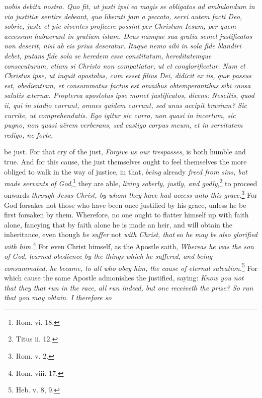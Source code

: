 \emph{nobis debita nostra. Quo fit, ut justi ipsi eo magis se obligatos ad ambulandum in via justitiæ sentire debeant, quo liberati jam a peccato, servi autem facti Deo, sobrie, juste et pie viventes proficere possint per Christum Iesum, per quem accessum habuerunt in gratiam istam. Deus namque sua gratia semel justificatos non deserit, nisi ab eis prius deseratur. Itaque nemo sibi in sola fide blandiri debet, putans fide sola se heredem esse constitutum, hereditatemque consecuturum, etiam si Christo non compatiatur, ut et conglorificetur. Nam et Christus ipse, ut inquit apostolus, cum esset filius Dei, didicit ex iis, quæ passus est, obedientiam, et consummatus factus est omnibus obtemperantibus sibi causa salutis æternæ. Propterea apostolus ipse monet justificatos, dicens: Nescitis, quod ii, qui in stadio currunt, omnes quidem currunt, sed unus accipit bravium? Sic currite, ut comprehendatis. Ego igitur sic curro, non quasi in incertum, sic pugno, non quasi aërem verberans, sed castigo corpus meum, et in servitutem redigo, ne forte, }

be just. For that cry of the just, \emph{Forgive us our trespasses}, is both humble and true. And for this cause, the just themselves ought to feel themselves the more obliged to walk in the way of justice, in that, \emph{being} already \emph{freed from sins, but made servants of God},\footnote{\par   Rom. vi. 18.} they are able, \emph{living soberly, justly, and godly},\footnote{\par   Titus ii. 12.} to proceed onwards \emph{through Jesus Christ, by whom they have had access unto this grace.}\footnote{\par   Rom. v. 2.} For God forsakes not those who have been once justified by his grace, unless he be first forsaken by them. Wherefore, no one ought to flatter himself up with faith alone, fancying that by faith alone he is made an heir, and will obtain the inheritance, even though \emph{he suffer} not \emph{with Christ, that} so \emph{he may be also glorified with him.}\footnote{\par   Rom. viii. 17.} For even Christ himself, as the Apostle saith, \emph{Whereas he was the son of God, learned obedience by the things which he suffered, and being consummated, he became, to all who obey him, the cause of eternal salvation.}\footnote{\par  Heb. v. 8, 9.} For which cause the same Apostle admonishes the justified, saying: \emph{Know you not that they that run in the race, all run indeed, but one receiveth the prize? So run that you may obtain. I therefore so}

